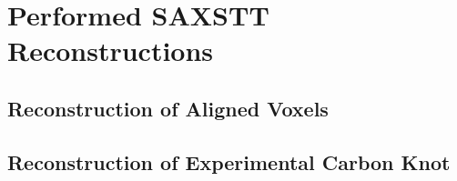 \chapter{Performed SAXSTT Reconstructions}

\section{Reconstruction of Aligned Voxels}%

\section{Reconstruction of Experimental Carbon Knot}

